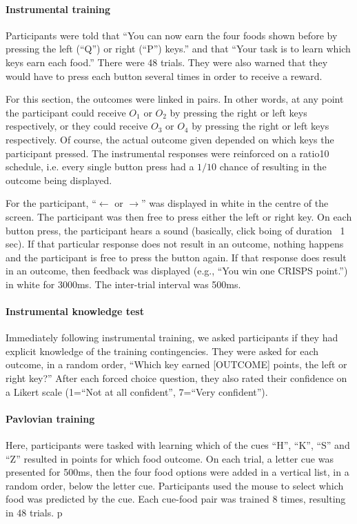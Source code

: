\documentclass[12pt]{article}
\begin{document}
\paragraph{Instrumental training} Participants were told that ``You can now
earn the four foods shown before by pressing the left (``Q'') or right (``P'')
keys.'' and that ``Your task is to learn which keys earn each food.'' There were
48 trials. They were also warned that they would have to press each button several times in order to receive a reward. 

For this section, the outcomes were linked in pairs. In other words, at any point the participant could receive $O_1$ or $O_2$ by pressing the right or left keys respectively, or they could receive $O_3$ or $O_4$ by pressing the right or left keys respectively. Of course, the actual outcome given depended on which keys the participant pressed. The instrumental responses were reinforced on a ratio10 schedule, i.e. every single button press had a $1/10$ chance of resulting in the outcome being displayed.

For the participant, ``$\leftarrow$ or $\rightarrow$'' was displayed in
white in the centre of the screen. The participant was then free to press either the left or right key. On each button press, the participant hears a sound (basically, click boing of duration ~1 sec). If that particular response does not result in an outcome, nothing happens and the participant is free to press the button again. If that response does result in an outcome, then feedback was displayed (e.g., ``You win one CRISPS point.'') in white for 3000ms. The inter-trial interval was 500ms.

\paragraph{Instrumental knowledge test}
Immediately following instrumental training, we asked participants if they had explicit knowledge of the training contingencies. They were asked for each outcome, in a random order, ``Which key earned [OUTCOME] points, the left or right key?'' After each forced
choice question, they also rated their confidence on a Likert scale (1=``Not at
all confident'', 7=``Very confident''). 

\paragraph{Pavlovian training}
Here, participants were tasked with learning which of the cues ``H'', ``K'', ``S'' and ``Z'' resulted in points for which food outcome. On each trial, a letter cue was presented for 500ms, then the four food options were added in a vertical list, in a random order, below the letter cue. Participants used the mouse to select which food was predicted by the cue. Each cue-food pair was trained 8 times, resulting in 48 trials. p
\end{document}
